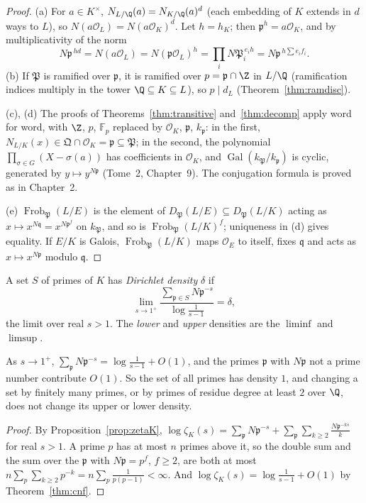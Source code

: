 \begin{proof}
(a) For $a\in K^\times$, $N_{L/\Q}(a)=N_{K/\Q}(a)^d$ (each embedding of $K$ extends in $d$ ways to $L$), so $N(a\mathcal O_L)=N(a\mathcal O_K)^d$.
Let $h=h_K$; then $\mathfrak p^h=a\mathcal O_K$, and by multiplicativity of the norm
\[
N\mathfrak p^{\,hd}=N(a\mathcal O_L)=N(\mathfrak p\mathcal O_L)^h=\prod_iN\mathfrak P_i^{\,e_ih}=N\mathfrak p^{\,h\sum e_if_i}.
\]
(b) If $\mathfrak P$ is ramified over $\mathfrak p$, it is ramified over $p=\mathfrak p\cap\Z$ in $L/\Q$ (ramification indices multiply in
the tower $\Q\subseteq K\subseteq L$), so $p\mid d_L$ (Theorem~\ref{thm:ramdisc}).

(c), (d) The proofs of Theorems~\ref{thm:transitive} and~\ref{thm:decomp} apply word for word, with $\Z$, $p$, $\mathbb F_p$ replaced by
$\mathcal O_K$, $\mathfrak p$, $k_{\mathfrak p}$: in the first, $N_{L/K}(x)\in\mathfrak Q\cap\mathcal O_K=\mathfrak p\subseteq\mathfrak P$; in
the second, the polynomial $\prod_{\sigma\in G}(X-\sigma(a))$ has coefficients in $\mathcal O_K$, and $\operatorname{Gal}(k_{\mathfrak
P}/k_{\mathfrak p})$ is cyclic, generated by $y\mapsto y^{N\mathfrak p}$ (Tome~2, Chapter~9). The conjugation formula is proved as in
Chapter~2.

(e) $\operatorname{Frob}_{\mathfrak P}(L/E)$ is the element of $D_{\mathfrak P}(L/E)\subseteq D_{\mathfrak P}(L/K)$ acting as $x\mapsto
x^{N\mathfrak q}=x^{N\mathfrak p^f}$ on $k_{\mathfrak P}$, and so is $\operatorname{Frob}_{\mathfrak P}(L/K)^f$; uniqueness in (d) gives equality.
If $E/K$ is Galois, $\operatorname{Frob}_{\mathfrak P}(L/K)$ maps $\mathcal O_E$ to itself, fixes $\mathfrak q$ and acts as $x\mapsto
x^{N\mathfrak p}$ modulo $\mathfrak q$.
\end{proof}

\begin{definition}
A set $S$ of primes of $K$ has \emph{Dirichlet density} $\delta$ if
\[
\lim_{s\to1^+}\frac{\sum_{\mathfrak p\in S}N\mathfrak p^{-s}}{\log\frac1{s-1}}=\delta ,
\]
the limit over real $s>1$. The \emph{lower} and \emph{upper} densities are the $\liminf$ and $\limsup$.
\end{definition}

\begin{proposition}\label{prop:primesum}
As $s\to1^+$, $\sum_{\mathfrak p}N\mathfrak p^{-s}=\log\frac1{s-1}+O(1)$, and the primes $\mathfrak p$ with $N\mathfrak p$ not a prime number
contribute $O(1)$. So the set of all primes has density $1$, and changing a set by finitely many primes, or by primes of residue degree at
least $2$ over $\Q$, does not change its upper or lower density.
\end{proposition}
\begin{proof}
By Proposition~\ref{prop:zetaK}, $\log\zeta_K(s)=\sum_{\mathfrak p}N\mathfrak p^{-s}+\sum_{\mathfrak p}\sum_{k\ge2}\frac{N\mathfrak p^{-ks}}k$ for
real $s>1$. A prime $p$ has at most $n$ primes above it, so the double sum and the sum over the $\mathfrak p$ with $N\mathfrak p=p^f$, $f\ge2$,
are both at most $n\sum_p\sum_{k\ge2}p^{-k}=n\sum_p\frac1{p(p-1)}<\infty$. And $\log\zeta_K(s)=\log\frac1{s-1}+O(1)$ by
Theorem~\ref{thm:cnf}.
\end{proof}

